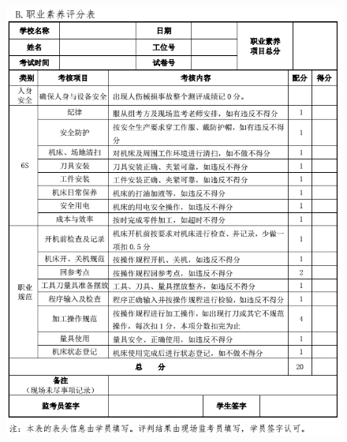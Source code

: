 \begin{figure}
	\centering
	\includegraphics[width=0.9\linewidth]{images/1-9}
	\caption{}
	\label{fig:1-1}
\end{figure}